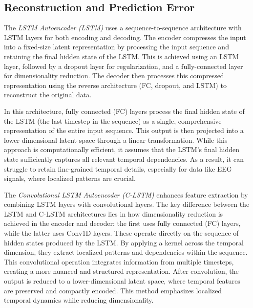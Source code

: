 \documentclass[runningheads]{llncs}
\begin{document}
\subsection{Reconstruction and Prediction Error}

The \emph{LSTM Autoencoder (LSTM)} uses a sequence-to-sequence
architecture with LSTM layers for both encoding and decoding. The
encoder compresses the input into a fixed-size latent representation
by processing the input sequence and retaining the final hidden state
of the LSTM. This is achieved using an LSTM layer, followed by a
dropout layer for regularization, and a fully-connected layer for
dimensionality reduction. The decoder then processes this compressed
representation using the reverse architecture (FC, dropout, and LSTM)
to reconstruct the original data.

In this architecture, fully connected (FC) layers process the final
hidden state of the LSTM (the last timestep in the sequence) as a
single, comprehensive representation of the entire input
sequence. This output is then projected into a lower-dimensional
latent space through a linear transformation. While this approach is
computationally efficient, it assumes that the LSTM's final hidden
state sufficiently captures all relevant temporal dependencies. As a
result, it can struggle to retain fine-grained temporal details,
especially for data like EEG signals, where localized patterns are
crucial.

The \emph{Convolutional LSTM Autoencoder (C-LSTM)} enhances feature
extraction by combining LSTM layers with convolutional layers. The
key difference between the LSTM and C-LSTM architectures lies in how
dimensionality reduction is achieved in the encoder and decoder: the
first uses fully connected (FC) layers, while the latter uses
Conv1D layers. These operate directly on the sequence of hidden states
produced by the LSTM. By applying a kernel across the temporal
dimension, they extract localized patterns and dependencies within the
sequence. This convolutional operation integrates information from
multiple timesteps, creating a more nuanced and structured
representation. After convolution, the output is reduced to a
lower-dimensional latent space, where temporal features are preserved
and compactly encoded. This method emphasizes localized temporal
dynamics while reducing dimensionality.
\end{document}
